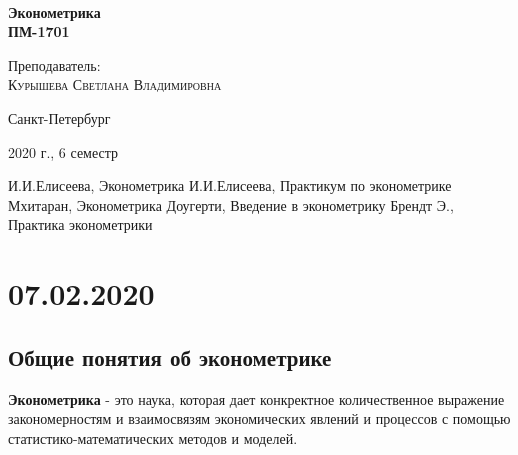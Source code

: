 \documentclass[aps,%
12pt,%
final,%
oneside,
onecolumn,%
musixtex, %
superscriptaddress,%
centertags]{article} %
\begin{document}
\begin{titlepage} 
\begin{center}
 
\textbf{}\\[10.0cm]
\textbf{\LARGE Эконометрика}\\[0.5cm]
\textbf{\Large ПМ-1701} \\[0.1cm]

\begin{center} \large
{Преподаватель:} \\[0.5cm]
\textsc {Курышева Светлана Владимировна }\\
\end{center}
\vfill 

{\large {Санкт-Петербург}} \par
{\large {2020 г., 6 семестр}}
\end{center} 
\end{titlepage}

\begin{thebibliography}{3}
И.И.Елисеева, Эконометрика
И.И.Елисеева, Практикум по эконометрике 
Мхитаран, Эконометрика
Доугерти, Введение в эконометрику 
Брендт Э., Практика эконометрики
\end{thebibliography}
\tableofcontents
\newpage
\section{07.02.2020}
\subsection{Общие понятия об эконометрике} 
\textbf{Эконометрика} - это наука, которая дает конкректное количественное выражение закономерностям и взаимосвязям экономических явлений и процессов с помощью статистико-математических методов и моделей.
\end{document}
